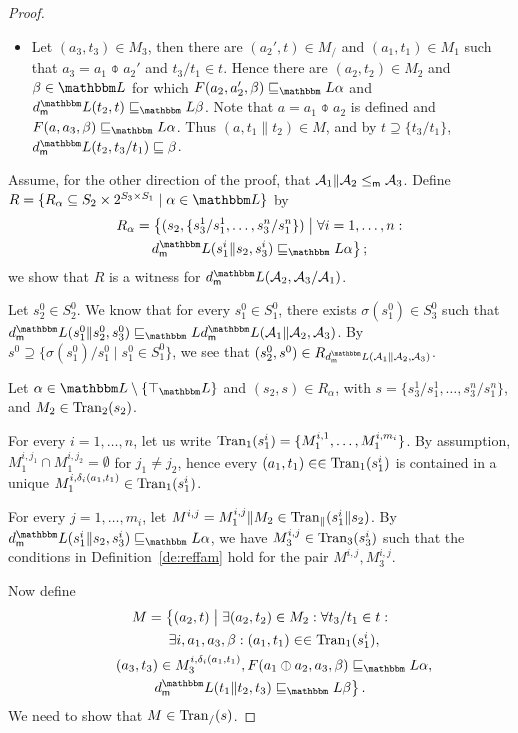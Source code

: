 \documentclass[twocolumn]{svjour3-dummy}
\newcommand*\mr{\le_\textup{\textsf{m}}}
\newcommand*\cA{\mathcal A}
\newcommand*\Tran{\textup{\textrm{Tran}}}
\newcommand*\by{/}
\newcommand*\LL{\mathbbm L}
\begin{document}
\begin{proof}
\begin{itemize}
  \item Let $( a_3, t_3)\in M_3$, then there are $( a_2', t)\in M_\by$
    and $( a_1, t_1)\in M_1$ such that $a_3= a_1\obar a_2'$ and $t_3\by
    t_1\in t$.  Hence there are $( a_2, t_2)\in M_2$ and $\beta\in \LL$
    for which $F( a_2, a_2', \beta)\sqsubseteq_\LL \alpha$ and $\mdl(
    t_2, t)\sqsubseteq_\LL \beta$.  Note that $a= a_1\obar a_2$ is
    defined and $F( a, a_3, \beta)\sqsubseteq_\LL \alpha$.  Thus $( a,
    t_1\| t_2)\in M$, and by $t\supseteq\{ t_3\by t_1\}$, $\mdl( t_2,
    t_3\by t_1)\sqsubseteq \beta$.
  \end{itemize}

  Assume, for the other direction of the proof, that $\cA_1\| \cA_2\mr
  \cA_3$.  Define $R=\{ R_\alpha\subseteq S_2\times 2^{ S_3\times
    S_1}\mid \alpha\in \LL\}$ by
  \begin{multline*}
    R_\alpha= \big\{ ( s_2,\{ s_3^1\by s_1^1,\dotsc, s_3^n\by s_1^n\})\bigmid
    \forall i= 1,\dotsc, n: \\
    \mdl( s_1^i\| s_2, s_3^i)\sqsubseteq_\LL \alpha\big\}\,;
  \end{multline*}
  we show that $R$ is a witness for $\mdl( \cA_2, \cA_3\by \cA_1)$.

  Let $s_2^0\in S_2^0$.  We know that for every $s_1^0\in S_1^0$, there
  exists $\sigma( s_1^0)\in S_3^0$ such that $\mdl( s_1^0\| s_2^0,
  s_3^0)\sqsubseteq_\LL \mdl( \cA_1\| \cA_2, \cA_3)$.  By
  $s^0\supseteq\{ \sigma( s_1^0)\by s_1^0\mid s_1^0\in S_1^0\}$, we see
  that $( s_2^0, s^0)\in R_{ \mdl( \cA_1\| \cA_2, \cA_3)}$.

  Let $\alpha\in \LL\setminus\{ \top_\LL\}$ and $( s_2, s)\in R_\alpha$,
  with $s=\{ s_3^1\by s_1^1,\dotsc, s_3^n\by s_1^n\}$, and $M_2\in
  \Tran_2( s_2)$.

  For every $i= 1,\dotsc, n$, let us write $\Tran_1( s_1^i)=\{ M_1^{ i,
    1},\dotsc, M_1^{ i, m_i}\}$.  By assumption, $M_1^{ i, j_1}\cap
  M_1^{ i, j_2}= \emptyset$ for $j_1\ne j_2$, hence every $( a_1,
  t_1)\in \in \Tran_1( s_1^i)$ is contained in a unique $M_1^{ i,
    \delta_i( a_1, t_1)}\in \Tran_1( s_1^i)$.

  For every $j= 1,\dotsc, m_i$, let $M^{ i, j}= M_1^{ i, j}\| M_2\in
  \Tran_\|( s_1^i\| s_2)$.  By $\mdl( s_1^i\| s_2, s_3^i)\sqsubseteq_\LL
  \alpha$, we have $M_3^{ i, j}\in \Tran_3( s_3^i)$ such that the
  conditions in Definition~\ref{de:reffam} hold for the pair $M^{ i, j},
  M_3^{ i, j}$.

  Now define
  \begin{multline}
    \label{eq:quotproof2.M}
    M= \big\{( a_2, t)\bigmid \exists( a_2, t_2)\in M_2: \forall t_3\by
    t_1\in t: \\
    \qquad \exists i, a_1, a_3, \beta: ( a_1, t_1)\in \in \Tran_1(
    s_1^i), \\
    \qquad ( a_3, t_3)\in M_3^{ i, \delta_i( a_1, t_1)}, F( a_1\obar
    a_2, a_3, \beta)\sqsubseteq_\LL \alpha, \\
    \mdl( t_1\| t_2, t_3)\sqsubseteq_\LL \beta\big\}\,.
  \end{multline}
  We need to show that $M\in \Tran_\by( s)$.


\end{proof}
\end{document}

